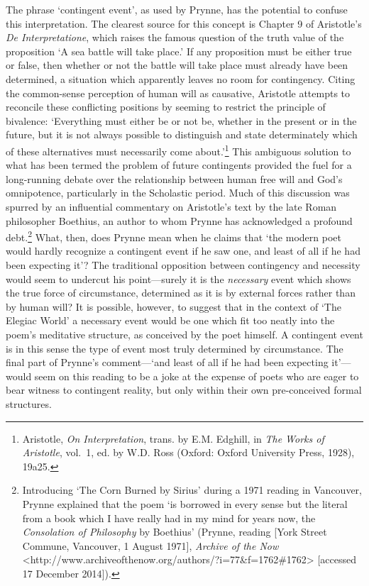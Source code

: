 \documentclass[]{article}
\begin{document}
The phrase ‘contingent event’, as used by Prynne, has the potential to
confuse this interpretation. The clearest source for this concept is
Chapter 9 of Aristotle’s \emph{De Interpretatione}, which raises the
famous question of the truth value of the proposition ‘A sea battle will
take place.’ If any proposition must be either true or false, then
whether or not the battle will take place must already have been
determined, a situation which apparently leaves no room for contingency.
Citing the common-sense perception of human will as causative, Aristotle
attempts to reconcile these conflicting positions by seeming to restrict
the principle of bivalence: ‘Everything must either be or not be,
whether in the present or in the future, but it is not always possible
to distinguish and state determinately which of these alternatives must
necessarily come about.’\footnote{Aristotle, \emph{On Interpretation},
  trans. by E.M. Edghill, in \emph{The Works of Aristotle}, vol.~1, ed.
  by W.D. Ross (Oxford: Oxford University Press, 1928), 19a25.} This
ambiguous solution to what has been termed the problem of future
contingents provided the fuel for a long-running debate over the
relationship between human free will and God’s omnipotence, particularly
in the Scholastic period. Much of this discussion was spurred by an
influential commentary on Aristotle’s text by the late Roman philosopher
Boethius, an author to whom Prynne has acknowledged a profound
debt.\footnote{Introducing ‘The Corn Burned by Sirius’ during a 1971
  reading in Vancouver, Prynne explained that the poem ‘is borrowed in
  every sense but the literal from a book which I have really had in my
  mind for years now, the \emph{Consolation of Philosophy} by Boethius’
  (Prynne, reading {[}York Street Commune, Vancouver, 1 August 1971{]},
  \emph{Archive of the Now}
  \textless{}http://www.archiveofthenow.org/authors/?i=77\&f=1762\#1762\textgreater{}
  {[}accessed 17 December 2014{]}).} What, then, does Prynne mean when
he claims that ‘the modern poet would hardly recognize a contingent
event if he saw one, and least of all if he had been expecting it’? The
traditional opposition between contingency and necessity would seem to
undercut his point—surely it is the \emph{necessary} event which shows
the true force of circumstance, determined as it is by external forces
rather than by human will? It is possible, however, to suggest that in
the context of ‘The Elegiac World’ a necessary event would be one which
fit too neatly into the poem’s meditative structure, as conceived by the
poet himself. A contingent event is in this sense the type of event most
truly determined by circumstance. The final part of Prynne’s
comment—‘and least of all if he had been expecting it’—would seem on
this reading to be a joke at the expense of poets who are eager to bear
witness to contingent reality, but only within their own pre-conceived
formal structures.
\end{document}
